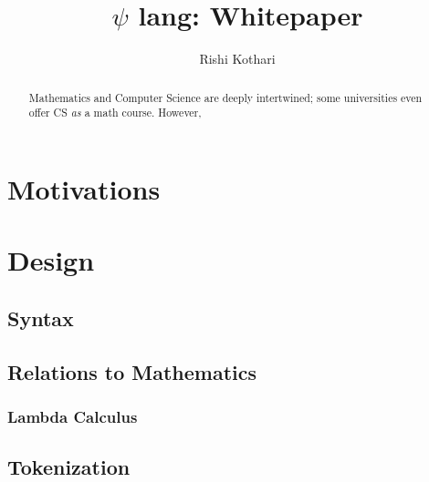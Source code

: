 \documentclass[11pt, oneside]{article}
\title{$\psi$ lang: Whitepaper}
\author{Rishi Kothari}
\date{}
\begin{document}
\maketitle

\newpage

\tableofcontents
\newpage
{}
\begin{abstract}
	Mathematics and Computer Science are deeply intertwined; some universities even offer CS \textit{as} a math course. However, 
\end{abstract}

\section{Motivations}


\section{Design}

\subsection{Syntax}

\subsection{Relations to Mathematics}

\subsubsection{Lambda Calculus}

\subsection{Tokenization}
\end{document}
